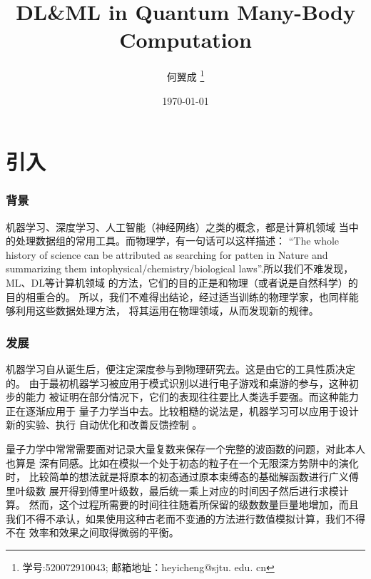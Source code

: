 \documentclass[UTF8,a4paper,10pt]{ctexart}
\title{\textbf{DL\&ML in Quantum Many-Body Computation}}
\author{ 何翼成 \thanks{学号:520072910043; \newline
    邮箱地址：heyicheng@sjtu. edu. cn} }
\date{\today}
\begin{document}
\maketitle
\section{引入}
\subsubsection{背景}
机器学习、深度学习、人工智能（神经网络）之类的概念，都是计算机领域
当中的处理数据组的常用工具。而物理学，有一句话可以这样描述：
“The whole history of science can be attributed as searching 
for patten in Nature and summarizing them intophysical/chemistry/biological laws”.所以我们不难发现，ML、DL等计算机领域
 的方法，它们的目的正是和物理（或者说是自然科学）的目的相重合的。
 所以，我们不难得出结论，经过适当训练的物理学家，也同样能够利用这些数据处理方法，
 将其运用在物理领域，从而发现新的规律。\newline

\subsubsection{发展}
机器学习自从诞生后，便注定深度参与到物理研究去。这是由它的工具性质决定的。
由于最初机器学习被应用于模式识别以进行电子游戏和桌游的参与，这种初步的能力
被证明在部分情况下，它们的表现往往要比人类选手要强。而这种能力正在逐渐应用于
量子力学当中去。比较粗糙的说法是，机器学习可以应用于设计新的实验、执行
自动优化和改善反馈控制 \cite{carleo_solving_2017} 。\newline

量子力学中常常需要面对记录大量复数来保存一个完整的波函数的问题，对此本人也算是
深有同感。比如在模拟一个处于初态的粒子在一个无限深方势阱中的演化时，
比较简单的想法就是将原本的初态通过原本束缚态的基础解函数进行广义傅里叶级数
展开得到傅里叶级数，最后统一乘上对应的时间因子然后进行求模计算。
然而，这个过程所需要的时间往往随着所保留的级数数量巨量地增加，而且
我们不得不承认，如果使用这种古老而不变通的方法进行数值模拟计算，我们不得不在
效率和效果之间取得微弱的平衡。\newline
\end{document}
